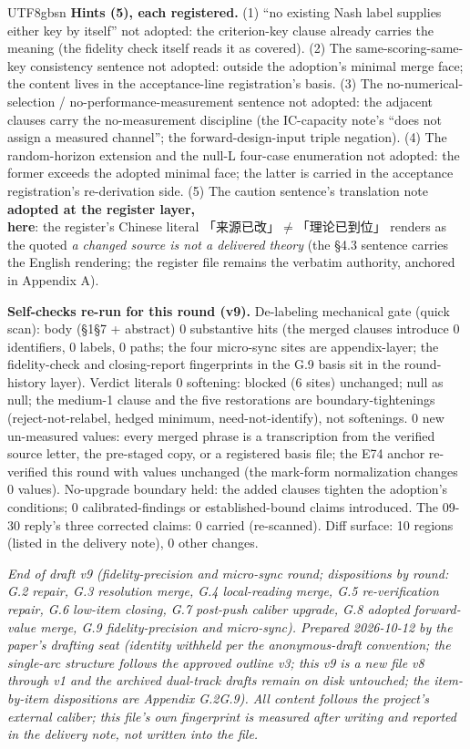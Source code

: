 \documentclass[11pt,letterpaper]{article}
\begin{document}
\begin{CJK}{UTF8}{gbsn}
\textbf{Hints (5), each registered.} (1) ``no existing Nash label supplies either key by itself'' \textemdash{} not adopted: the criterion-key clause already carries the meaning (the fidelity check itself reads it as covered). (2) The same-scoring-same-key consistency sentence \textemdash{} not adopted: outside the adoption's minimal merge face; the content lives in the acceptance-line registration's basis. (3) The no-numerical-selection / no-performance-measurement sentence \textemdash{} not adopted: the adjacent clauses carry the no-measurement discipline (the IC-capacity note's ``does not assign a measured channel''; the forward-design-input triple negation). (4) The random-horizon extension and the null-L four-case enumeration \textemdash{} not adopted: the former exceeds the adopted minimal face; the latter is carried in the acceptance registration's re-derivation side. (5) The caution sentence's translation note \textemdash{} \textbf{adopted at the register layer, here}: the register's Chinese literal 「来源已改」\ensuremath{\neq}「理论已到位」 renders as the quoted \emph{a changed source is not a delivered theory} (the \S{}4.3 sentence carries the English rendering; the register file remains the verbatim authority, anchored in Appendix A).

\textbf{Self-checks re-run for this round (v9).} De-labeling mechanical gate (quick scan): body (\S{}1\textendash{}\S{}7 + abstract) 0 substantive hits (the merged clauses introduce 0 identifiers, 0 labels, 0 paths; the four micro-sync sites are appendix-layer; the fidelity-check and closing-report fingerprints in the G.9 basis sit in the round-history layer). Verdict literals 0 softening: blocked (6 sites) unchanged; null as null; the medium-1 clause and the five restorations are boundary-tightenings (reject-not-relabel, hedged minimum, need-not-identify), not softenings. 0 new un-measured values: every merged phrase is a transcription from the verified source letter, the pre-staged copy, or a registered basis file; the E74 anchor re-verified this round with values unchanged (the mark-form normalization changes 0 values). No-upgrade boundary held: the added clauses tighten the adoption's conditions; 0 calibrated-findings or established-bound claims introduced. The 09-30 reply's three corrected claims: 0 carried (re-scanned). Diff surface: 10 regions (listed in the delivery note), 0 other changes.

\emph{End of draft v9 (fidelity-precision and micro-sync round; dispositions by round: G.2 repair, G.3 resolution merge, G.4 local-reading merge, G.5 re-verification repair, G.6 low-item closing, G.7 post-push caliber upgrade, G.8 adopted forward-value merge, G.9 fidelity-precision and micro-sync). Prepared 2026-10-12 by the paper's drafting seat (identity withheld per the anonymous-draft convention; the single-arc structure follows the approved outline v3; this v9 is a new file \textemdash{} v8 through v1 and the archived dual-track drafts remain on disk untouched; the item-by-item dispositions are Appendix G.2\textendash{}G.9). All content follows the project's external caliber; this file's own fingerprint is measured after writing and reported in the delivery note, not written into the file.}


\end{CJK}
\end{document}
